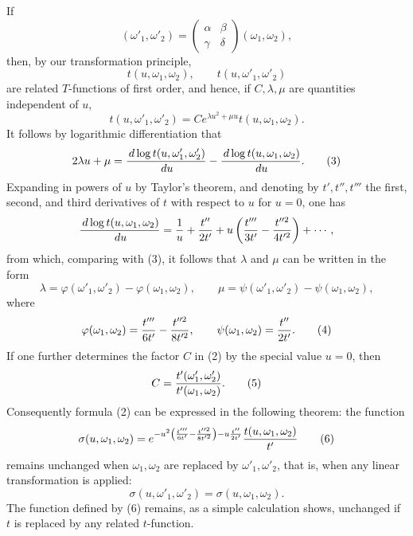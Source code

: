 \documentclass[11pt]{article}
\providecommand{\dd}{\,d}
\begin{document}
If
\[
(\omega'_1,\omega'_2)=
\begin{pmatrix}\alpha&\beta\\ \gamma&\delta\end{pmatrix}(\omega_1,\omega_2),
\]
then, by our transformation principle,
\[
t(u,\omega_1,\omega_2),\qquad t(u,\omega'_1,\omega'_2)
\]
are related $T$-functions of first order, and hence, if $C,\lambda,\mu$ are quantities independent of $u$,
\begin{equation}
t(u,\omega'_1,\omega'_2)=Ce^{\lambda u^2+\mu u}t(u,\omega_1,\omega_2). \tag{2}
\end{equation}
It follows by logarithmic differentiation that
\begin{equation}
2\lambda u+\mu={\dd\log t(u,\omega'_1,\omega'_2)\over\dd u}
-{\dd\log t(u,\omega_1,\omega_2)\over\dd u}. \tag{3}
\end{equation}
Expanding in powers of $u$ by Taylor's theorem, and denoting by $t',t'',t'''$ the first, second, and third derivatives of $t$ with respect to $u$ for $u=0$, one has
\[
{\dd\log t(u,\omega_1,\omega_2)\over \dd u}
={1\over u}+{t''\over 2t'}+u\left({t'''\over3t'}-{t''^2\over4t'^2}\right)+\cdots,
\]
from which, comparing with (3), it follows that $\lambda$ and $\mu$ can be written in the form
\[
\lambda=\varphi(\omega'_1,\omega'_2)-\varphi(\omega_1,\omega_2),
\qquad
\mu=\psi(\omega'_1,\omega'_2)-\psi(\omega_1,\omega_2),
\]
where
\begin{equation}
\varphi(\omega_1,\omega_2)={t'''\over6t'}-{t''^2\over8t'^2},
\qquad
\psi(\omega_1,\omega_2)={t''\over2t'}. \tag{4}
\end{equation}
If one further determines the factor $C$ in (2) by the special value $u=0$, then
\begin{equation}
C={t'(\omega'_1,\omega'_2)\over t'(\omega_1,\omega_2)}. \tag{5}
\end{equation}
Consequently formula (2) can be expressed in the following theorem: the function
\begin{equation}
\sigma(u,\omega_1,\omega_2)=e^{-u^2\left({t'''\over6t'}-{t''^2\over8t'^2}\right)-u{t''\over2t'}}
{t(u,\omega_1,\omega_2)\over t'} \tag{6}
\end{equation}
remains unchanged when $\omega_1,
\omega_2$ are replaced by $\omega'_1,
\omega'_2$, that is, when any linear transformation is applied:
\begin{equation}
\sigma(u,\omega'_1,\omega'_2)=\sigma(u,\omega_1,\omega_2). \tag{7}
\end{equation}
The function defined by (6) remains, as a simple calculation shows, unchanged if $t$ is replaced by any related $t$-function.
\end{document}
